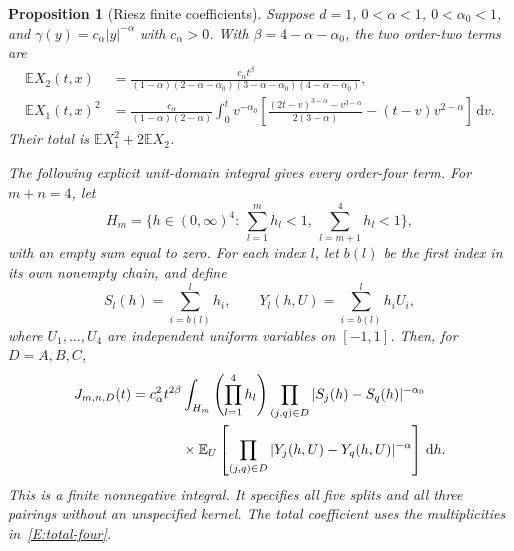 \documentclass[12pt]{article}
\numberwithin{equation}{section}
\newtheorem{proposition}[theorem]{Proposition}
\theoremstyle{definition}
\newcommand{\E}{\mathbb{E}}
\newcommand{\ud}{\,\mathrm{d}}
\begin{document}
\begin{proposition}[Riesz finite coefficients]\label{P:riesz-small}
  Suppose $d=1$, $0<\alpha<1$, $0<\alpha_0<1$, and
  $\gamma(y)=c_\alpha|y|^{-\alpha}$ with $c_\alpha>0$.
  With $\beta=4-\alpha-\alpha_0$, the two order-two terms are
  \begin{equation}\label{E:riesz-two}
    \begin{split}
      \E X_2(t,x)
      &=\frac{c_\alpha t^\beta}
      {(1-\alpha)(2-\alpha-\alpha_0)(3-\alpha-\alpha_0)
      (4-\alpha-\alpha_0)},\\
      \E X_1(t,x)^2
      &=\frac{c_\alpha}{(1-\alpha)(2-\alpha)}
      \int_0^t v^{-\alpha_0}
      \left[\frac{(2t-v)^{3-\alpha}-v^{3-\alpha}}{2(3-\alpha)}
      -(t-v)v^{2-\alpha}\right]\ud v.
    \end{split}
  \end{equation}
  Their total is $\E X_1^2+2\E X_2$.

  The following explicit unit-domain integral gives every order-four
  term. For $m+n=4$, let
  \[
    H_m=\{h\in(0,\infty)^4:\ \sum_{l=1}^m h_l<1,
    \ \sum_{l=m+1}^4 h_l<1\},
  \]
  with an empty sum equal to zero. For each index $l$, let $b(l)$ be
  the first index in its own nonempty chain, and define
  \[
    S_l(h)=\sum_{i=b(l)}^l h_i,\qquad
    Y_l(h,U)=\sum_{i=b(l)}^l h_iU_i,
  \]
  where $U_1,\ldots,U_4$ are independent uniform variables on $[-1,1]$.
  Then, for $D=A,B,C$,
  \begin{equation}\label{E:riesz-four}
    \begin{split}
      J_{m,n,D}(t)
      ={}&c_\alpha^2t^{2\beta}
      \int_{H_m}\left(\prod_{l=1}^4h_l\right)
      \prod_{(j,q)\in D}|S_j(h)-S_q(h)|^{-\alpha_0}\\
      &\hspace{8mm}\times
      \E_U\left[\prod_{(j,q)\in D}
      |Y_j(h,U)-Y_q(h,U)|^{-\alpha}\right]\ud h.
    \end{split}
  \end{equation}
  This is a finite nonnegative integral. It specifies all five splits
  and all three pairings without an unspecified kernel. The total
  coefficient uses the multiplicities in~\eqref{E:total-four}.
\end{proposition}
\end{document}
